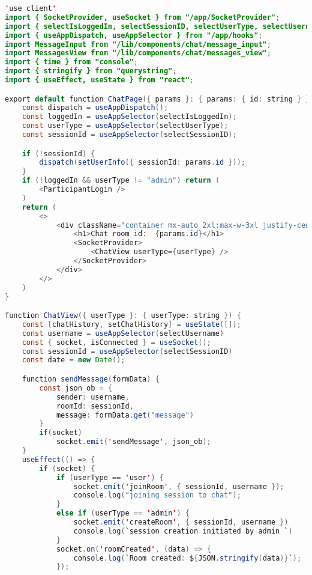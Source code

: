 \begin{lstlisting}[language=Java, caption={Chat Page Component}, label={lst:java}]
'use client'
import { SocketProvider, useSocket } from "/app/SocketProvider";
import { selectIsLoggedIn, selectSessionID, selectUserType, selectUsername, setUserInfo } from "/app/global.state";
import { useAppDispatch, useAppSelector } from "/app/hooks";
import MessageInput from "/lib/components/chat/message_input";
import MessagesView from "/lib/components/chat/messages_view";
import { time } from "console";
import { stringify } from "querystring";
import { useEffect, useState } from "react";

export default function ChatPage({ params }: { params: { id: string } }) {
    const dispatch = useAppDispatch();
    const loggedIn = useAppSelector(selectIsLoggedIn);
    const userType = useAppSelector(selectUserType);
    const sessionId = useAppSelector(selectSessionID);

    if (!sessionId) {
        dispatch(setUserInfo({ sessionId: params.id }));
    }
    if (!loggedIn && userType != "admin") return (
        <ParticipantLogin />
    )
    return (
        <>
            <div className="container mx-auto 2xl:max-w-3xl justify-center items-center">
                <h1>Chat room id:  {params.id}</h1>
                <SocketProvider>
                    <ChatView userType={userType} />
                </SocketProvider>
            </div>
        </>
    )
}

function ChatView({ userType }: { userType: string }) {
    const [chatHistory, setChatHistory] = useState([]);
    const username = useAppSelector(selectUsername)
    const { socket, isConnected } = useSocket();
    const sessionId = useAppSelector(selectSessionID)
    const date = new Date();

    function sendMessage(formData) {
        const json_ob = {
            sender: username,
            roomId: sessionId,
            message: formData.get("message")
        }
        if(socket)
            socket.emit('sendMessage', json_ob);
    }
    useEffect(() => {
        if (socket) {
            if (userType == 'user') {
                socket.emit('joinRoom', { sessionId, username });
                console.log("joining session to chat");
            }
            else if (userType == 'admin') {
                socket.emit('createRoom', { sessionId, username })
                console.log(`session creation initiated by admin `)
            }
            socket.on('roomCreated', (data) => {
                console.log(`Room created: ${JSON.stringify(data)}`);
            });
    

\end{lstlisting}
